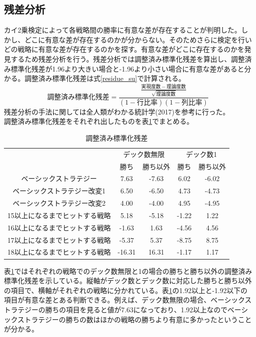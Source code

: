 \subsection{残差分析}
カイ2乗検定によって各戦略間の勝率に有意な差が存在することが判明した。しかし、どこに有意な差が存在するのかが分からない。そのためさらに検定を行いどの戦略に有意な差が存在するのかを探す。有意な差がどこに存在するのかを発見するため残差分析を行う。残差分析では調整済み標準化残差を算出し、調整済み標準化残差が1.96より大きい場合と-1.96より小さい場合に有意な差があると分かる。調整済み標準化残差は式\ref{residue_su}で計算される。
\begin{equation} 調整済み標準化残差 =  \frac{\frac{実現度数 - 理論度数}{\sqrt{理論度数}}}{(1-行比率)(1-列比率)} \label{residue_su}\end{equation}
残差分析の手法に関しては全人類がわかる統計学(2017)を参考に行った。\\
調整済み標準化残差をそれぞれ出したものを表\ref{residue}でまとめる。
\begin{table}[H]
 \caption{調整済み標準化残差\label{residue}}
 \begin{center}
  \begin{tabular}{|c|c|c|c|c|}
    \hline
     & \multicolumn{2}{c|}{デック数無限} & \multicolumn{2}{c|}{デック数1} \\
    \cline{2-5} & 勝ち & 勝ち以外 & 勝ち & 勝ち以外 \\
    \hline ベーシックストラテジー & 7.63 & -7.63 & 6.02 & -6.02  \\
    \hline ベーシックストラテジー改変1 & 6.50 & -6.50 & 4.73 & -4.73  \\
    \hline ベーシックストラテジー改変2 & 4.00 & -4.00 & 4.95 & -4.95  \\
    \hline 15以上になるまでヒットする戦略 & 5.18 & -5.18 & -1.22 & 1.22  \\
    \hline 16以上になるまでヒットする戦略 & -1.63 & 1.63 & -4.56 & 4.56  \\
    \hline 17以上になるまでヒットする戦略 & -5.37 & 5.37 & -8.75 & 8.75  \\
    \hline 18以上になるまでヒットする戦略 & -16.31 & 16.31 & -1.17 & 1.17  \\
    \hline
  \end{tabular}
 \end{center}
\end{table}
表\ref{residue}ではそれぞれの戦略でのデック数無限と1の場合の勝ちと勝ち以外の調整済み標準化残差を示している。縦軸がデック数とデック数に対応した勝ちと勝ち以外の項目で、横軸がそれぞれの戦略に分かれている。表\ref{residue}の1.92以上と-1.92以下の項目が有意な差とある判断できる。例えば、デック数無限の場合、ベーシックストラテジーの勝ちの項目を見ると値が7.63になっており、1.92以上なのでベーシックストラテジーの勝ちの数はほかの戦略の勝ちより有意に多かったということが分かる。

